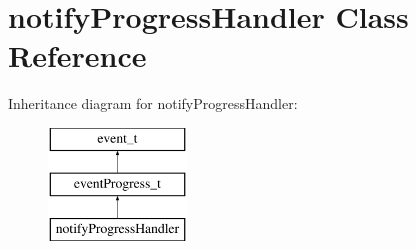 \hypertarget{classnotifyProgressHandler}{\section{notify\-Progress\-Handler \-Class \-Reference}
\label{classnotifyProgressHandler}
}
\-Inheritance diagram for notify\-Progress\-Handler\-:\begin{figure}[H]
\begin{center}
\leavevmode
\includegraphics[height=3.000000cm]{classnotifyProgressHandler}
\end{center}
\end{figure}
